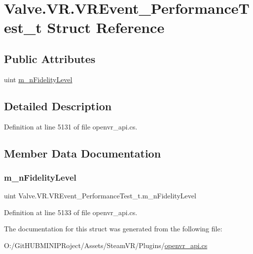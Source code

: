 \hypertarget{struct_valve_1_1_v_r_1_1_v_r_event___performance_test__t}{}\section{Valve.\+V\+R.\+V\+R\+Event\+\_\+\+Performance\+Test\+\_\+t Struct Reference}
\label{struct_valve_1_1_v_r_1_1_v_r_event___performance_test__t}
\subsection*{Public Attributes}
\begin{DoxyCompactItemize}
\item 
uint \mbox{\hyperlink{struct_valve_1_1_v_r_1_1_v_r_event___performance_test__t_a0758f033b3a47672adb680a0c1b7c2f4}{m\+\_\+n\+Fidelity\+Level}}
\end{DoxyCompactItemize}


\subsection{Detailed Description}


Definition at line 5131 of file openvr\+\_\+api.\+cs.



\subsection{Member Data Documentation}
\mbox{\label{struct_valve_1_1_v_r_1_1_v_r_event___performance_test__t_a0758f033b3a47672adb680a0c1b7c2f4}} 
\subsubsection{\texorpdfstring{m\_nFidelityLevel}{m\_nFidelityLevel}}
{\footnotesize\ttfamily uint Valve.\+V\+R.\+V\+R\+Event\+\_\+\+Performance\+Test\+\_\+t.\+m\+\_\+n\+Fidelity\+Level}



Definition at line 5133 of file openvr\+\_\+api.\+cs.



The documentation for this struct was generated from the following file\+:\begin{DoxyCompactItemize}
\item 
O\+:/\+Git\+H\+U\+B\+M\+I\+N\+I\+P\+Roject/\+Assets/\+Steam\+V\+R/\+Plugins/\mbox{\hyperlink{openvr__api_8cs}{openvr\+\_\+api.\+cs}}\end{DoxyCompactItemize}
